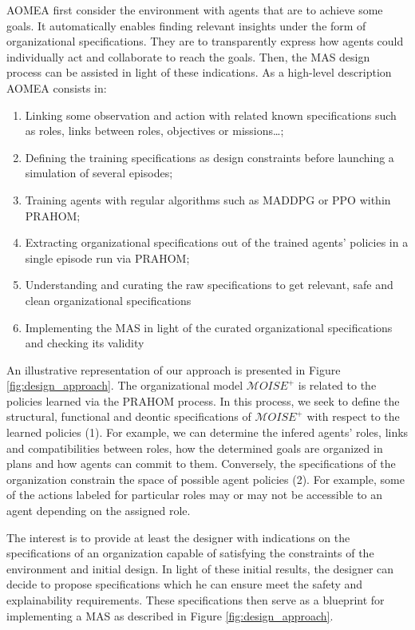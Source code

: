 \documentclass[runningheads]{llncs}
\begin{document}
AOMEA first consider the environment with agents that are to achieve some goals. It automatically enables finding relevant insights under the form of organizational specifications. They are to transparently express how agents could individually act and collaborate to reach the goals. Then, the MAS design process can be assisted in light of these indications. As a high-level description AOMEA consists in:
\begin{enumerate}
    \item Linking some observation and action with related known specifications such as roles, links between roles, objectives or missions\dots;
    \item Defining the training specifications as design constraints before launching a simulation of several episodes;
    \item Training agents with regular algorithms such as MADDPG or PPO within PRAHOM;
    \item Extracting organizational specifications out of the  trained agents' policies in a single episode run via PRAHOM;
    \item Understanding and curating the raw specifications to get relevant, safe and clean organizational specifications
    \item Implementing the MAS in light of the curated organizational specifications and checking its validity
\end{enumerate}

An illustrative representation of our approach is presented in Figure \ref{fig:design_approach}. The organizational model $\mathcal{M}OISE^{+}$ is related to the policies learned via the PRAHOM process. In this process, we seek to define the structural, functional and deontic specifications of $\mathcal{M}OISE^{+}$ with respect to the learned policies (1). For example, we can determine the infered agents' roles, links and compatibilities between roles, how the determined goals are organized in plans and how agents can commit to them. Conversely, the specifications of the organization constrain the space of possible agent policies (2). For example, some of the actions labeled for particular roles may or may not be accessible to an agent depending on the assigned role.

The interest is to provide at least the designer with indications on the specifications of an organization capable of satisfying the constraints of the environment and initial design. In light of these initial results, the designer can decide to propose specifications which he can ensure meet the safety and explainability requirements. These specifications then serve as a blueprint for implementing a MAS as described in Figure \ref{fig:design_approach}.
\end{document}
